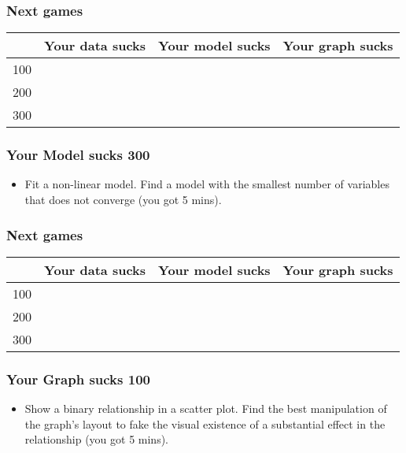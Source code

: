 \documentclass[xcolor=table,dvipsnames]{beamer}
\begin{document}
\begin{frame}
\frametitle{Next games}
\begin{table}[H]\centering
{\color{white} \begin{tabular}{|r|c|c|c|} \hline
\rowcolor{jeopardy} & Your data sucks & Your model sucks & Your graph sucks \\\hline
\rowcolor{jeopardy} 100 & & & \\\hline
\rowcolor{jeopardy} 200 & & & \\\hline
\rowcolor{jeopardy} 300 & &	& \\\hline
\end{tabular}}
\end{table}

\end{frame}	


\begin{frame}
\frametitle{Your Model sucks 300}
\begin{itemize}	
\item[] Fit a non-linear model. Find a model with the smallest number of variables that does not converge (you got 5 mins). 
\end{itemize}
\end{frame}	

\begin{frame}
\frametitle{Next games}
\begin{table}[H]\centering
{\color{white} \begin{tabular}{|r|c|c|c|} \hline
\rowcolor{jeopardy} & Your data sucks & Your model sucks & Your graph sucks \\\hline
\rowcolor{jeopardy} 100 & & & \\\hline
\rowcolor{jeopardy} 200 & & & \\\hline
\rowcolor{jeopardy} 300 & &	& \\\hline
\end{tabular}}
\end{table}

\end{frame}	


\begin{frame}
\frametitle{Your Graph sucks 100}
\begin{itemize}	
\item[] Show a binary relationship in a scatter plot. Find the best manipulation of the graph's layout to fake the visual existence of a substantial effect in the relationship (you got 5 mins). 
\end{itemize}
\end{frame}	
\end{document}
